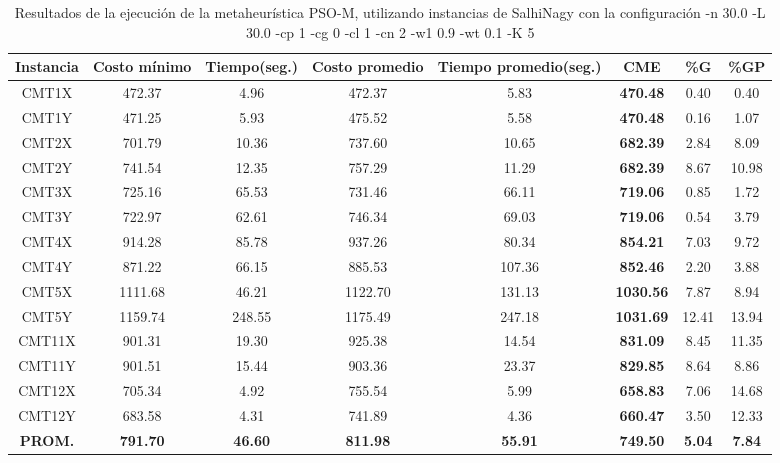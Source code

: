 \begin{table}[h]
\caption{Resultados de la ejecución de la metaheurística PSO-M, utilizando instancias de SalhiNagy con la configuración -n 30.0 -L 30.0 -cp 1 -cg 0 -cl 1 -cn 2 -w1 0.9 -wt 0.1 -K 5}
\centering
\small
\begin{tabular}{c c c c c c c c}
\hline\hline
Instancia & Costo mínimo & Tiempo(seg.) & Costo promedio & Tiempo promedio(seg.) & CME & \%G & \%GP \\ [0.5ex]
\hline
CMT1X & 472.37 & 4.96 & 
472.37 & 5.83 & \bf{470.48} & 
0.40 & 0.40\\CMT1Y & 471.25 & 5.93 & 
475.52 & 5.58 & \bf{470.48} & 
0.16 & 1.07\\CMT2X & 701.79 & 10.36 & 
737.60 & 10.65 & \bf{682.39} & 
2.84 & 8.09\\CMT2Y & 741.54 & 12.35 & 
757.29 & 11.29 & \bf{682.39} & 
8.67 & 10.98\\CMT3X & 725.16 & 65.53 & 
731.46 & 66.11 & \bf{719.06} & 
0.85 & 1.72\\CMT3Y & 722.97 & 62.61 & 
746.34 & 69.03 & \bf{719.06} & 
0.54 & 3.79\\CMT4X & 914.28 & 85.78 & 
937.26 & 80.34 & \bf{854.21} & 
7.03 & 9.72\\CMT4Y & 871.22 & 66.15 & 
885.53 & 107.36 & \bf{852.46} & 
2.20 & 3.88\\CMT5X & 1111.68 & 46.21 & 
1122.70 & 131.13 & \bf{1030.56} & 
7.87 & 8.94\\CMT5Y & 1159.74 & 248.55 & 
1175.49 & 247.18 & \bf{1031.69} & 
12.41 & 13.94\\CMT11X & 901.31 & 19.30 & 
925.38 & 14.54 & \bf{831.09} & 
8.45 & 11.35\\CMT11Y & 901.51 & 15.44 & 
903.36 & 23.37 & \bf{829.85} & 
8.64 & 8.86\\CMT12X & 705.34 & 4.92 & 
755.54 & 5.99 & \bf{658.83} & 
7.06 & 14.68\\CMT12Y & 683.58 & 4.31 & 
741.89 & 4.36 & \bf{660.47} & 
3.50 & 12.33\\\bf{PROM.} & 
\bf{791.70} & \bf{46.60} & \bf{811.98} & \bf{55.91} & \bf{749.50} & \bf{5.04} & \bf{7.84}\\[1ex]\hline
\end{tabular}
\label{table:nonlin}
\end{table}
